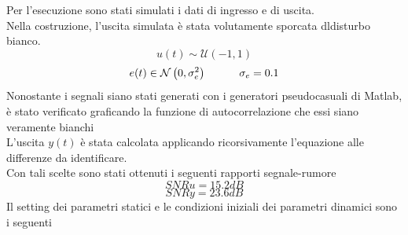 \documentclass[10pt,a4paper,oneside,openany,noindent]{report}
\begin{document}
Per l'esecuzione sono stati simulati i dati di ingresso e di uscita.\\
Nella costruzione, l'uscita simulata è stata volutamente sporcata dldisturbo bianco.\\
\[u(t)\sim \mathcal{U}(-1,1)\]
\[e(t)\in \mathcal{N}\left(0,\sigma^2_e\right) \hspace{3em} \sigma_e=0.1\]
Nonostante i segnali siano stati generati con i generatori pseudocasuali di Matlab, è stato verificato 
graficando la funzione di autocorrelazione che essi siano veramente bianchi \\
L'uscita $y(t)$ è stata calcolata applicando ricorsivamente l'equazione alle differenze da identificare.\\
Con tali scelte sono stati ottenuti i seguenti rapporti segnale-rumore
\begin{equation}
SNRu =15.2 dB
\end{equation}
\begin{equation}
SNRy=23.6 dB
\end{equation}
Il setting dei parametri statici e le condizioni iniziali dei parametri dinamici sono i seguenti
\end{document}

